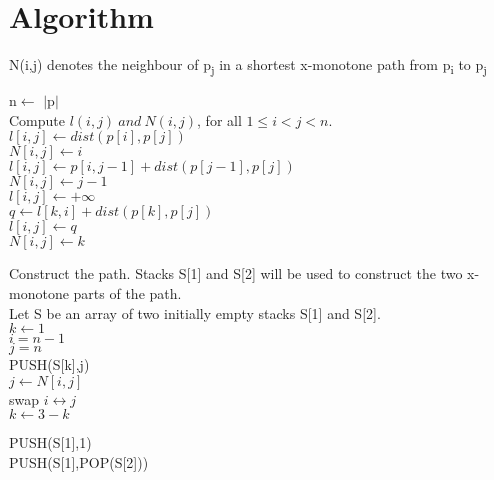 \documentclass{article}
\begin{document}
  \section{Algorithm}
    N(i,j) denotes the neighbour of p\textsubscript{j} in a shortest x-monotone path from p\textsubscript{i} to p\textsubscript{j}\\  
    \begin{algorithm}[H]
	n$\leftarrow$ $\vert$p$\vert$\\
	Compute $l(i,j)\ and\ N(i,j)$, for all $1 \leq i < j < n$.\\
	{
		{
			{
				$l[i,j] \longleftarrow dist(p[i], p[j])$\\
				$N[i,j] \longleftarrow i$\\
			}
			{
				$l[i,j] \longleftarrow p[i,j-1] + dist(p[j-1],p[j])$\\
				$N[i,j] \longleftarrow j-1$\\
			}
			\Else
			{
				$l[i,j] \longleftarrow +\infty $\\
				{
					$q \longleftarrow l[k,i] + dist(p[k],p[j])$\\
					{
						$l[i,j] \longleftarrow q$\\
						$N[i,j] \longleftarrow k$\\
					}	
				}
			}
		}
	}	
     
Construct the path. Stacks S[1] and S[2] will be used to construct the two x-monotone parts of the path.\\
Let S be an array of two initially empty stacks S[1] and S[2].\\

	$k \longleftarrow 1 $\\
	$i=n-1 $\\
	$j=n $\\
	{
		PUSH(S[k],j)\\
		$j \longleftarrow N[i,j]$\\
		{
			swap $i \longleftrightarrow j$\\
			$k \longleftarrow 3-k$\\
		}
	}

	PUSH(S[1],1)\\
	{
		PUSH(S[1],POP(S[2]))\\
	}
     \end{algorithm}
     
\end{document}

